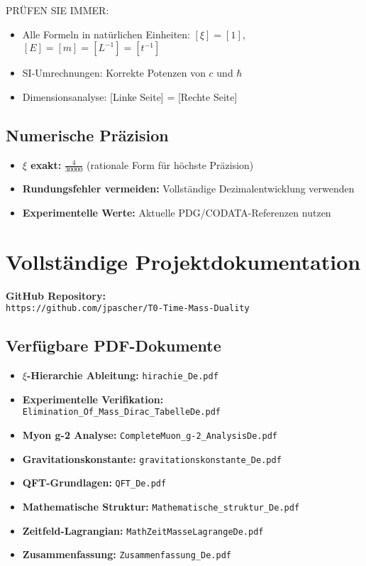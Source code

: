 \documentclass[12pt,a4paper]{article}
\begin{document}
	PRÜFEN SIE IMMER:
	\begin{itemize}
		\item Alle Formeln in natürlichen Einheiten: \([\xi] = [1]\), \([E] = [m] = [L^{-1}] = [t^{-1}]\)
		\item SI-Umrechnungen: Korrekte Potenzen von \(c\) und \(\hbar\)
		\item Dimensionsanalyse: [Linke Seite] = [Rechte Seite]
	\end{itemize}
	
	\subsection{Numerische Präzision}
	
	\begin{itemize}
		\item \textbf{\(\xi\) exakt:} \(\frac{4}{30000}\) (rationale Form für höchste Präzision)
		\item \textbf{Rundungsfehler vermeiden:} Vollständige Dezimalentwicklung verwenden
		\item \textbf{Experimentelle Werte:} Aktuelle PDG/CODATA-Referenzen nutzen
	\end{itemize}
	
	\section{Vollständige Projektdokumentation}
	
	\textbf{GitHub Repository:}\\
	\texttt{https://github.com/jpascher/T0-Time-Mass-Duality}
	
	\subsection{Verfügbare PDF-Dokumente}
	
	\begin{itemize}
		\item \textbf{\(\xi\)-Hierarchie Ableitung:} \texttt{hirachie\_De.pdf}
		\item \textbf{Experimentelle Verifikation:} \texttt{Elimination\_Of\_Mass\_Dirac\_TabelleDe.pdf}
		\item \textbf{Myon g-2 Analyse:} \texttt{CompleteMuon\_g-2\_AnalysisDe.pdf}
		\item \textbf{Gravitationskonstante:} \texttt{gravitationskonstante\_De.pdf}
		\item \textbf{QFT-Grundlagen:} \texttt{QFT\_De.pdf}
		\item \textbf{Mathematische Struktur:} \texttt{Mathematische\_struktur\_De.pdf}
		\item \textbf{Zeitfeld-Lagrangian:} \texttt{MathZeitMasseLagrangeDe.pdf}
		\item \textbf{Zusammenfassung:} \texttt{Zusammenfassung\_De.pdf}
	\end{itemize}
	
\end{document}
